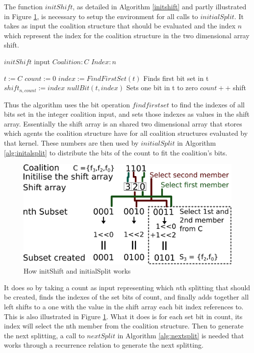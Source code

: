 \documentclass{llncs}
\begin{document}
The function $initShift$, as detailed in Algorithm \ref{initshift} and partly illustrated in Figure \ref{fig:howitworks}, 
 is necessary to setup the environment for all calls to $initialSplit$.
 It takes as input the coalition structure that should be evaluated and the index $n$ which
represent the index for the coalition structure in the two dimensional array shift.
\begin{algorithm}
\caption{$initShift$ input $Coalition:C$ $Index:n$ \label{initshift}}
\begin{algorithmic}[1]
\STATE $t :=C$
\STATE $count := 0$
 { 
\STATE $index := FindFirstSet(t)$ \hfill Finds first bit set in t
\STATE $shift_{n,count} := index$ 
\STATE $nullBit(t,index)$ \hfill Sets one bit in t to zero
\STATE $count++$
}
\ENDWHILE
\RETURN shift
\end{algorithmic}
\end{algorithm}

Thus the algorithm uses the bit operation $find first set$ to find the indexes of all bits set in the integer coalition input, and sets those indexes as values in the shift array. Essentially the shift array is an shared two dimensional array that stores which agents the coalition structure have for all coalition structures evaluated by that kernel. These numbers are then used by $initialSplit$ in Algorithm \ref{alg:initalsplit} to distribute the bits of the count to fit the coalition's bits. 
\begin{figure}[htbp]
\centering
\includegraphics[width=0.7\linewidth]{test}
\caption{How initShift and initialSplit works\label{fig:howitworks}}
\end{figure}

It does so by taking a count as input representing which $n$th splitting that should be created, finds the indexes of the set bits of count, and finally adds together all left shifts to a one with the value in the shift array each bit index references to. This is also illustrated in Figure \ref{fig:howitworks}. What it does is for each set bit in count, its index will select the nth member from the coalition structure. Then to generate the next splitting, a call to $nextSplit$ in Algorithm \ref{alg:nextsplit} is needed that works through a recurrence relation to generate the next splitting.
\end{document}

